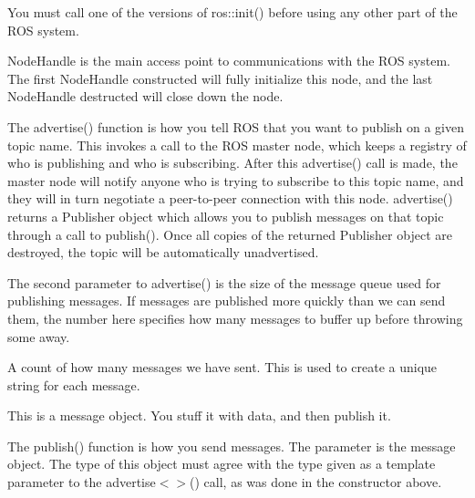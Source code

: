 You must call one of the versions of ros\-::init() before using any other part of the R\-O\-S system.

Node\-Handle is the main access point to communications with the R\-O\-S system. The first Node\-Handle constructed will fully initialize this node, and the last Node\-Handle destructed will close down the node.

The advertise() function is how you tell R\-O\-S that you want to publish on a given topic name. This invokes a call to the R\-O\-S master node, which keeps a registry of who is publishing and who is subscribing. After this advertise() call is made, the master node will notify anyone who is trying to subscribe to this topic name, and they will in turn negotiate a peer-\/to-\/peer connection with this node. advertise() returns a Publisher object which allows you to publish messages on that topic through a call to publish(). Once all copies of the returned Publisher object are destroyed, the topic will be automatically unadvertised.

The second parameter to advertise() is the size of the message queue used for publishing messages. If messages are published more quickly than we can send them, the number here specifies how many messages to buffer up before throwing some away.

A count of how many messages we have sent. This is used to create a unique string for each message.

This is a message object. You stuff it with data, and then publish it.

The publish() function is how you send messages. The parameter is the message object. The type of this object must agree with the type given as a template parameter to the advertise$<$$>$() call, as was done in the constructor above.